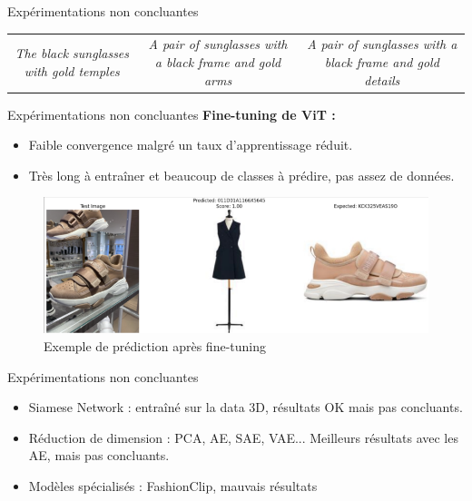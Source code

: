 \documentclass{beamer}
\begin{document}
\begin{frame}{Expérimentations non concluantes}
\begin{table}[h]
{\begin{tabular}{c c c}
        \parbox{0.3\textwidth}{\centering \large \textit{The black sunglasses with gold temples}} & 
        \parbox{0.3\textwidth}{\centering \large \textit{A pair of sunglasses with a black frame and gold arms}} & 
        \parbox{0.3\textwidth}{\centering \large \textit{A pair of sunglasses with a black frame and gold details}} \\ 
    \end{tabular}%
    }
\end{table}
\end{frame}

\begin{frame}{Expérimentations non concluantes}
\textbf{Fine-tuning de ViT :}
\begin{itemize}
        \item Faible convergence malgré un taux d'apprentissage réduit.
        \item Très long à entraîner et beaucoup de classes à prédire, pas assez de données.
\end{itemize}

\vspace{0.5cm}

\begin{figure}[h]
    \centering
    \includegraphics[width=1\textwidth]{assets/finetuning_vit.png}
    \caption{Exemple de prédiction après fine-tuning}
\end{figure}
\end{frame}

\begin{frame}{Expérimentations non concluantes}
    \begin{itemize}
            \item Siamese Network : entraîné sur la data 3D, résultats OK mais pas concluants.
            \item Réduction de dimension : PCA, AE, SAE, VAE... Meilleurs résultats avec les AE, mais pas concluants.
            \item Modèles spécialisés : FashionClip, mauvais résultats
    \end{itemize}

\end{frame}
\end{document}
